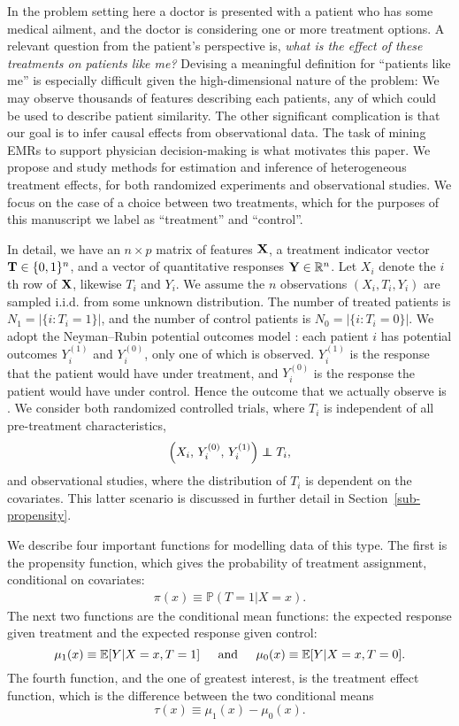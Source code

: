 \documentclass{article}
\def\mE{\mathbb{E}}\def\mI{\mathbb{I}}\def\mP{\mathbb{P}}\def\mR{\mathbb{R}}
\def\l{\left}\def\r{\right}\def\lf{\lfloor}\def\rf{\rfloor}
\newcommand\independent{\protect\mathpalette{\protect\independenT}{\perp}}
\def\independenT#1#2{\mathrel{\rlap{$#1#2$}\mkern2mu{#1#2}}}
\begin{document}
In the problem setting here a doctor is presented
with a patient who has some medical ailment, and the doctor is considering one
or more treatment options. A relevant question from the patient's perspective
is, {\it what is the effect of these treatments on patients like me?} Devising
a meaningful definition for ``patients like me'' is especially difficult given the high-dimensional nature of the problem: We may observe thousands of features
describing each patients, any of which could be used to describe patient
similarity. The other significant complication is that our goal is to infer
causal effects from observational data. The task of mining EMRs to support
physician decision-making is what motivates this paper. We propose and study
methods for estimation and inference of heterogeneous treatment effects, for
both randomized experiments and observational studies. We focus on the case of
a choice between two treatments, which for the purposes of this manuscript we
label as ``treatment'' and ``control''.

In detail, we have  an $n\times p$ matrix of features $\mathbf{X}$, a treatment
indicator vector $\mathbf{T} \in \{0, 1\}^n$, and a vector of quantitative responses
$\bY \in \mR^n$. Let $X_i$ denote
the $i$th row of $\mathbf{X}$, likewise $T_i$ and $Y_i$. We assume the $n$
observations $(X_i, T_i, Y_i)$ are sampled i.i.d. from some unknown
distribution. The number of treated
patients is $N_1 = |\{i:T_i=1\}|$, and the number of control patients is
$N_0 = |\{i:T_i=0\}|$.
We adopt the Neyman--Rubin potential outcomes model
\citep{Splawa-Neyman-etal90, Rubin74}: each patient $i$ has potential outcomes
$Y_i^{(1)}$ and $Y_i^{(0)}$, only one of which is observed. $Y_i^{(1)}$ is the
response that the patient would have under treatment, and $Y_i^{(0)}$ is the
response the patient would have under control. Hence the outcome that we
actually observe is .
We consider both randomized controlled trials, where $T_i$ is independent of
all pre-treatment characteristics,
\begin{equation}
\label{eq:rct}
\l(X_i, \, Y_i^{(0)}, \, Y_i^{(1)}\r) \independent T_i,
\end{equation}
and observational studies, where the distribution of $T_i$ is dependent on the
covariates. This latter scenario is discussed in further detail in
Section~\ref{sub-propensity}.

We describe four important functions for modelling data of this type.
The first is the propensity function, which gives the probability of treatment
assignment, conditional on covariates: \begin{gather}
\label{eqn-propensity}
\pi(x) \equiv \mP(T = 1 | X = x).
\end{gather}
The next two functions are the conditional mean functions: the expected
response given treatment and the expected response given control:
$$\mu_1(x) \equiv \mE[Y | X = x, T = 1] \hspace{4mm}\mbox{ and }\hspace{4mm}
\mu_0(x) \equiv \mE[Y | X = x, T = 0].$$
The fourth function, and the one of greatest interest, is the treatment
effect function, which is the difference between the two conditional means
$$\tau(x) \equiv \mu_1(x) - \mu_0(x).$$
\end{document}
